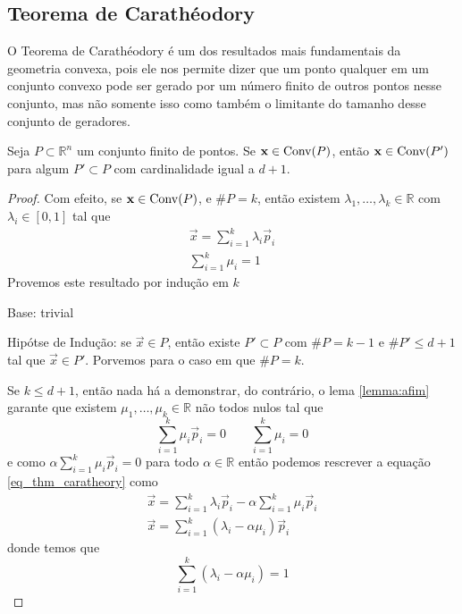 \subsection{Teorema de Carathéodory}

O Teorema de Carathéodory é um dos resultados mais fundamentais da geometria
convexa, pois ele nos permite dizer que um ponto qualquer em um conjunto
convexo pode ser gerado por um número finito de outros pontos nesse conjunto,
mas não somente isso como também o limitante do tamanho desse conjunto de
geradores.

\begin{thm:caratheodory}[Carathéodory]
	Seja $P \subset \mathbb{R}^n$ um conjunto finito de pontos. Se $\mathbf x \in \mathrm{Conv}(P)$, então
	  $\mathbf x \in \mathrm{Conv}(P')$ para algum $P' \subset P$ com cardinalidade igual a $d + 1$.

	\begin{proof}
		Com efeito, se $\mathbf x \in \mathrm{Conv}(P)$, e $\#P = k$, então existem $\lambda_1, \ldots, \lambda_k
		\in \mathbb{R}$ com $\lambda_i \in [0, 1]$ tal que
		\begin{equation}
		\label{eq_thm_caratheory}
		\begin{gathered}
			\vec x = \displaystyle\sum_{i=1}^k \lambda_i \vec p_i \\
			\displaystyle\sum_{i=1}^k \mu_i = 1
		\end{gathered}
		\end{equation}
		Provemos este resultado por indução em $k$

		Base: trivial

		Hipótse de Indução: se $\vec x \in P$, então existe $P' \subset P$
		com $\#P = k - 1$ e $\#P' \leq d + 1$ tal
		que $\vec x \in P'$. Porvemos para o caso em que $\#P = k$.

		Se $k \leq d + 1$, então nada há a demonstrar, do contrário, o lema \ref{lemma:afim}
		garante que existem $\mu_1, \ldots, \mu_k \in \mathbb{R}$ não todos nulos tal que
		\[
		  \displaystyle\sum_{i=1}^k \mu_i \vec p_i = 0 \quad\quad \sum_{i=1}^{k} \mu_i = 0
		\]
		e como \(\alpha \displaystyle\sum_{i=1}^k \mu_i \vec p_i = 0\) para todo $\alpha \in \mathbb{R}$
		então podemos rescrever a equação \ref{eq_thm_caratheory} como
		\begin{gather*}
			\vec x = \displaystyle\sum_{i=1}^k \lambda_i \vec p_i - \alpha \displaystyle\sum_{i=1}^k \mu_i \vec p_i \\
			\vec x = \displaystyle\sum_{i=1}^k (\lambda_i - \alpha \mu_i) \vec p_i
		\end{gather*}
		donde temos que
		\[\displaystyle\sum_{i=1}^k (\lambda_i - \alpha \mu_i) = 1\]


\end{proof}
\end{thm:caratheodory}
